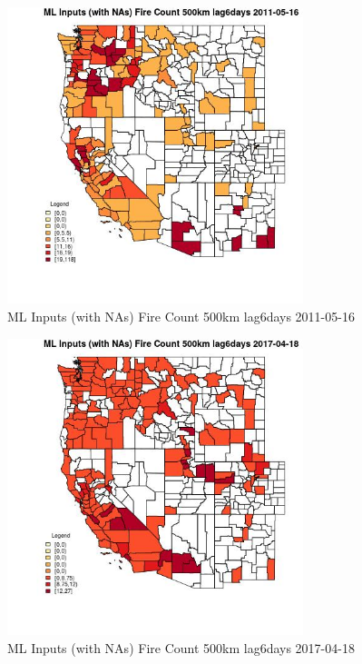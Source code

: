 \begin{figure} 
\centering  
\includegraphics[width=0.77\textwidth]{Code_Outputs/Report_ML_input_PM25_Step4_part_e_de_duplicated_aves_compiled_2019-05-21wNAs_CountyFire_Count_500km_lag6daysMean2011-05-16.jpg} 
\caption{\label{fig:Report_ML_input_PM25_Step4_part_e_de_duplicated_aves_compiled_2019-05-21wNAsCountyFire_Count_500km_lag6daysMean2011-05-16}ML Inputs (with NAs) Fire Count 500km lag6days 2011-05-16} 
\end{figure} 
 

\begin{figure} 
\centering  
\includegraphics[width=0.77\textwidth]{Code_Outputs/Report_ML_input_PM25_Step4_part_e_de_duplicated_aves_compiled_2019-05-21wNAs_CountyFire_Count_500km_lag6daysMean2017-04-18.jpg} 
\caption{\label{fig:Report_ML_input_PM25_Step4_part_e_de_duplicated_aves_compiled_2019-05-21wNAsCountyFire_Count_500km_lag6daysMean2017-04-18}ML Inputs (with NAs) Fire Count 500km lag6days 2017-04-18} 
\end{figure} 
 

